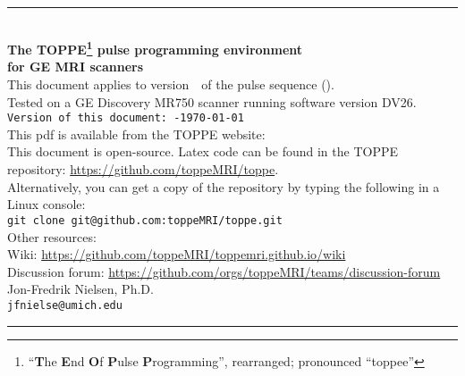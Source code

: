 

\begin{titlepage}
~\\[0.5in]
\begin{centering}
\rule{\textwidth}{5pt}
~\\[0.5in]
{\bf \huge The TOPPE\footnote{``\textbf{T}he \textbf{E}nd \textbf{O}f \textbf{P}ulse \textbf{P}rogramming'', rearranged; pronounced ``toppee''} pulse programming environment} \\ [0.4in]
{\bf \huge for GE MRI scanners} \\ [0.6in]
{This document applies to version~\toppeversion~of the pulse sequence (\toppe).   } \\ [0.1in]
{Tested on a GE Discovery MR750 scanner running software version DV26.   } \\ [0.3in]
{\tt Version of this document:~\toppeversion-\today} \\ [0.3in]
This pdf is available from the TOPPE website: \toppeweb \\ [0.2in]
This document is open-source. Latex code can be found in the TOPPE repository: \url{https://github.com/toppeMRI/toppe}. \\
Alternatively, you can get a copy of the repository by typing the following in a Linux console:\\
{\tt git clone git@github.com:toppeMRI/toppe.git} \\ [0.2in]
{Other resources:} \\
{Wiki: \url{https://github.com/toppeMRI/toppemri.github.io/wiki}} \\
{Discussion forum: \url{https://github.com/orgs/toppeMRI/teams/discussion-forum} } \\ [0.3in]
{Jon-Fredrik Nielsen, Ph.D.} \\
{\tt jfnielse@umich.edu} \\ [0.5in]
\rule{\textwidth}{5pt}
\end{centering}
\end{titlepage}


